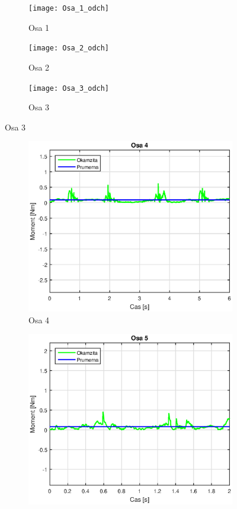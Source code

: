 \begin{figure}[h]
    \centering
    \begin{subfigure}[b]{0.7\textwidth}
        \texttt{[image: Osa\_1\_odch]}
        \caption{Osa 1}
        \label{osa_1_odch_pic}
    \end{subfigure}
    \begin{subfigure}[b]{0.7\textwidth}
        \texttt{[image: Osa\_2\_odch]}
        \caption{Osa 2}
        \label{osa_2_odch_pic}
    \end{subfigure}
    \begin{subfigure}[b]{0.7\textwidth}
        \texttt{[image: Osa\_3\_odch]}
        \caption{Osa 3}
        \label{osa_3_odch_pic}
    \end{subfigure}
\end{figure}
\begin{figure}\ContinuedFloat
    \begin{subfigure}[b]{0.7\textwidth}
        \includegraphics[width=\textwidth]{Osa_4_odch}
        \caption{Osa 4}
        \label{osa_4_odch_pic}
    \end{subfigure}
    \begin{subfigure}[b]{0.7\textwidth}
        \includegraphics[width=\textwidth]{Osa_5_odch}

\end{subfigure}
\end{figure}

